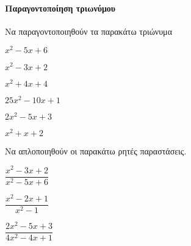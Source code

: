 \documentclass[11pt,a4paper,modern]{FFExercises}
\begin{document}
\paragraph{Παραγοντοποίηση τριωνύμου}
\askhsh Να παραγοντοποιηθούν τα παρακάτω τριώνυμα
\begin{multicols}{2}
\begin{alist}
\item $ x^2-5x+6 $
\item $ x^2-3x+2 $
\item $ x^2+4x+4 $
\item $ 25x^2-10x+1 $
\item $ 2x^2-5x+3 $
\item $ x^2+x+2 $
\end{alist}
\end{multicols}
\askhsh Να απλοποιηθούν οι παρακάτω ρητές παραστάσεις.
\begin{multicols}{2}
\begin{alist}
\item $ \dfrac{x^2-3x+2}{x^2-5x+6} $
\item $ \dfrac{x^2-2x+1}{x^2-1} $
\item $ \dfrac{2x^2-5x+3}{4x^2-4x+1} $
\end{alist}
\end{multicols}
\end{document}
